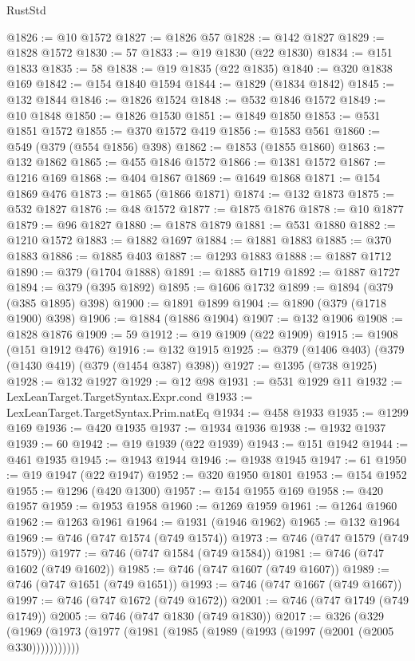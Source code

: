 \begin{lexlean}{RustStd}
\begin{coremodule}
{\begin{coremodule}
{{{{{{{{{{{{{{{{{{{{{{{{{{{{{{{{{{{{{{{{{{{{{{{{{{{{{{{{{{{{{{{{{{{{{{{{{{{{{{{{@1826 := @10 @1572
@1827 := @1826 @57
@1828 := @142 @1827
@1829 := @1828 @1572
@1830 := 57
@1833 := @19 @1830 (@22 @1830)
@1834 := @151 @1833
@1835 := 58
@1838 := @19 @1835 (@22 @1835)
@1840 := @320 @1838 @169
@1842 := @154 @1840 @1594
@1844 := @1829 (@1834 @1842)
@1845 := @132 @1844
@1846 := @1826 @1524
@1848 := @532 @1846 @1572
@1849 := @10 @1848
@1850 := @1826 @1530
@1851 := @1849 @1850
@1853 := @531 @1851 @1572
@1855 := @370 @1572 @419
@1856 := @1583 @561
@1860 := @549 (@379 (@554 @1856) @398)
@1862 := @1853 (@1855 @1860)
@1863 := @132 @1862
@1865 := @455 @1846 @1572
@1866 := @1381 @1572
@1867 := @1216 @169
@1868 := @404 @1867
@1869 := @1649 @1868
@1871 := @154 @1869 @476
@1873 := @1865 (@1866 @1871)
@1874 := @132 @1873
@1875 := @532 @1827
@1876 := @48 @1572
@1877 := @1875 @1876
@1878 := @10 @1877
@1879 := @96 @1827
@1880 := @1878 @1879
@1881 := @531 @1880
@1882 := @1210 @1572
@1883 := @1882 @1697
@1884 := @1881 @1883
@1885 := @370 @1883
@1886 := @1885 @403
@1887 := @1293 @1883
@1888 := @1887 @1712
@1890 := @379 (@1704 @1888)
@1891 := @1885 @1719
@1892 := @1887 @1727
@1894 := @379 (@395 @1892)
@1895 := @1606 @1732
@1899 := @1894 (@379 (@385 @1895) @398)
@1900 := @1891 @1899
@1904 := @1890 (@379 (@1718 @1900) @398)
@1906 := @1884 (@1886 @1904)
@1907 := @132 @1906
@1908 := @1828 @1876
@1909 := 59
@1912 := @19 @1909 (@22 @1909)
@1915 := @1908 (@151 @1912 @476)
@1916 := @132 @1915
@1925 := @379 (@1406 @403) (@379 (@1430 @419) (@379 (@1454 @387) @398))
@1927 := @1395 (@738 @1925)
@1928 := @132 @1927
@1929 := @12 @98
@1931 := @531 @1929 @11
@1932 := LexLeanTarget.TargetSyntax.Expr.cond
@1933 := LexLeanTarget.TargetSyntax.Prim.natEq
@1934 := @458 @1933
@1935 := @1299 @169
@1936 := @420 @1935
@1937 := @1934 @1936
@1938 := @1932 @1937
@1939 := 60
@1942 := @19 @1939 (@22 @1939)
@1943 := @151 @1942
@1944 := @461 @1935
@1945 := @1943 @1944
@1946 := @1938 @1945
@1947 := 61
@1950 := @19 @1947 (@22 @1947)
@1952 := @320 @1950 @1801
@1953 := @154 @1952
@1955 := @1296 (@420 @1300)
@1957 := @154 @1955 @169
@1958 := @420 @1957
@1959 := @1953 @1958
@1960 := @1269 @1959
@1961 := @1264 @1960
@1962 := @1263 @1961
@1964 := @1931 (@1946 @1962)
@1965 := @132 @1964
@1969 := @746 (@747 @1574 (@749 @1574))
@1973 := @746 (@747 @1579 (@749 @1579))
@1977 := @746 (@747 @1584 (@749 @1584))
@1981 := @746 (@747 @1602 (@749 @1602))
@1985 := @746 (@747 @1607 (@749 @1607))
@1989 := @746 (@747 @1651 (@749 @1651))
@1993 := @746 (@747 @1667 (@749 @1667))
@1997 := @746 (@747 @1672 (@749 @1672))
@2001 := @746 (@747 @1749 (@749 @1749))
@2005 := @746 (@747 @1830 (@749 @1830))
@2017 := @326
    (@329 (@1969 (@1973 (@1977 (@1981 (@1985 (@1989 (@1993 (@1997 (@2001 (@2005 @330)))))))))))
}}}}}}}}}}}}}}}}}}}}}}}}}}}}}}}}}}}}}}}}}}}}}}}}}}}}}}}}}}}}}}}}}}}}}}}}}}}}}}}}
\end{coremodule}}
\end{coremodule}
\end{lexlean}

